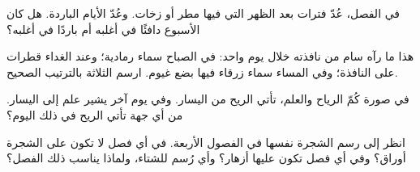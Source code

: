 \begin{exercise}[$\star\star$]\label{exo:g1:watching-the-weather:8}
في  الفصل، عُدّ فترات بعد الظهر التي فيها مطر أو زخات. وعُدّ
الأيام الباردة. هل كان الأسبوع دافئًا في أغلبه أم باردًا في أغلبه؟
\end{exercise}

\begin{exercise}[$\star\star$]\label{exo:g1:watching-the-weather:9}
هذا ما رآه سام من نافذته خلال يوم واحد: في الصباح سماء رمادية؛ وعند
الغداء قطرات على النافذة؛ وفي المساء سماء زرقاء فيها بضع غيوم. ارسم
 الثلاثة بالترتيب الصحيح.
\end{exercise}

\begin{exercise}[$\star\star$]\label{exo:g1:watching-the-weather:10}
في صورة كُمّ الرياح والعلم، تأتي الريح من اليسار. وفي يوم آخر يشير
علم إلى اليسار. من أي جهة تأتي الريح في ذلك
اليوم؟
\end{exercise}

\begin{exercise}[$\star\star$]\label{exo:g1:watching-the-weather:11}
انظر إلى رسم الشجرة نفسها في الفصول الأربعة. في أي فصل لا تكون على
الشجرة أوراق؟ وفي أي فصل تكون عليها أزهار؟ وأي  رُسم للشتاء،
ولماذا يناسب ذلك الفصل؟
\end{exercise}
